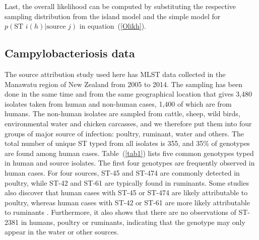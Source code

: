 \documentclass[times, doublespace]{WileyNJD-v2}%
\begin{document}
Last, the overall likelihood can be computed by substituting the respective sampling distribution from the island model and the simple model for $p(\text{ST }i(h)\vert\text{source }j)$ in equation~(\ref{Olikh}). 


\subsection{Campylobacteriosis data}
The source attribution study used here has MLST data collected in the Manawatu region of New Zealand from 2005 to 2014. The sampling has been done in the same time and from the same geographical location that gives 3,480 isolates taken from human and non-human cases, 1,400 of which are from humans. The non-human isolates are sampled from cattle, sheep, wild birds, environmental water and chicken carcasses, and we therefore put them into four groups of major source of infection: poultry, ruminant, water and others. The total number of unique ST typed from all isolates is 355, and 35\% of genotypes are found among human cases. Table~(\ref{tab1}) lists five common genotypes typed in human and source isolates. The first four genotypes are frequently observed in human cases. For four sources, ST-45 and ST-474 are commonly detected in poultry, while ST-42 and ST-61 are typically found in ruminants. Some studies also discover that human cases with ST-45 or ST-474 are likely attributable to poultry, whereas human cases with ST-42 or ST-61 are more likely attributable to ruminants \cite{Muell, Coll, Cart}. Furthermore, it also shows that there are no observations of ST-2381 in humans, poultry or ruminants, indicating that the genotype may only appear in the water or other sources.
\end{document}
